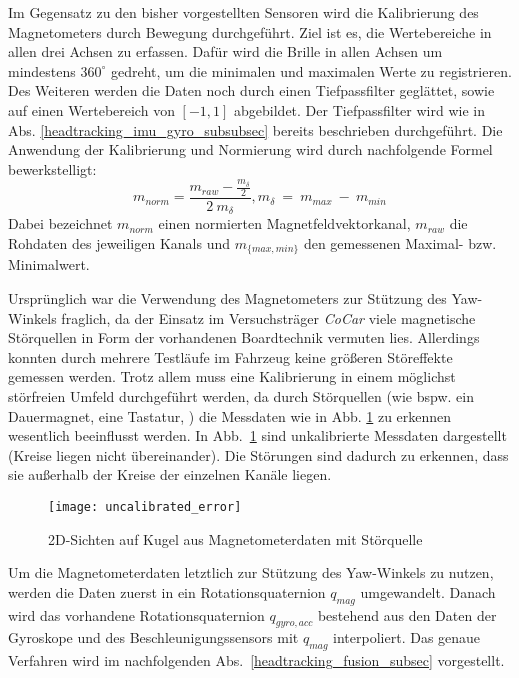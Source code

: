 Im Gegensatz zu den bisher vorgestellten Sensoren wird die Kalibrierung des Magnetometers durch Bewegung durchgeführt.
Ziel ist es, die Wertebereiche in allen drei Achsen zu erfassen.
Dafür wird die Brille in allen Achsen um mindestens $360^\circ$ gedreht, um die minimalen und maximalen Werte zu registrieren. 
Des Weiteren werden die Daten noch durch einen Tiefpassfilter geglättet, sowie auf einen Wertebereich von $[-1,1]$ abgebildet.
Der Tiefpassfilter wird wie in Abs. \ref{headtracking_imu_gyro_subsubsec} bereits beschrieben durchgeführt. 
Die Anwendung der Kalibrierung und Normierung wird durch nachfolgende Formel bewerkstelligt:
\begin{equation}
    m_{norm} = \frac{m_{raw}- \frac{m_{\delta}}{2}}{2~m_{\delta}},  m_{\delta}~=~m_{max}~-~m_{min}
\end{equation}
Dabei bezeichnet $m_{norm}$ einen normierten Magnetfeldvektorkanal, $m_{raw}$ die Rohdaten des jeweiligen Kanals und $m_{\lbrace max, min\rbrace}$ den gemessenen Maximal- bzw. Minimalwert.

Ursprünglich war die Verwendung des Magnetometers zur Stützung des Yaw-Winkels fraglich, da der Einsatz im Versuchsträger \emph{CoCar} viele magnetische Störquellen in Form der vorhandenen Boardtechnik vermuten lies. 
Allerdings konnten durch mehrere Testläufe im Fahrzeug keine größeren Störeffekte gemessen werden. Trotz allem muss eine Kalibrierung in einem möglichst störfreien Umfeld durchgeführt werden, da durch Störquellen (wie bspw. ein Dauermagnet, eine Tastatur, \oae) die Messdaten wie in Abb. \ref{fig:uncalibrated_error} zu erkennen wesentlich beeinflusst werden. In Abb.~\ref{fig:uncalibrated_error} sind unkalibrierte Messdaten dargestellt (Kreise liegen nicht übereinander). Die Störungen sind dadurch zu erkennen, dass sie außerhalb der Kreise der einzelnen Kanäle liegen.

\begin{figure}[ht]
	\centering
    \texttt{[image: uncalibrated\_error]}
	\caption[]{2D-Sichten auf Kugel aus Magnetometerdaten mit Störquelle}
	\label{fig:uncalibrated_error}
\end{figure}

Um die Magnetometerdaten letztlich zur Stützung des Yaw-Winkels zu nutzen, werden die Daten zuerst in ein Rotationsquaternion $q_{mag}$ umgewandelt.
Danach wird das vorhandene Rotationsquaternion $q_{gyro,acc}$ bestehend aus den Daten der Gyroskope und des Beschleunigungssensors mit $q_{mag}$ interpoliert.
Das genaue Verfahren wird im nachfolgenden Abs.~\ref{headtracking_fusion_subsec} vorgestellt.
